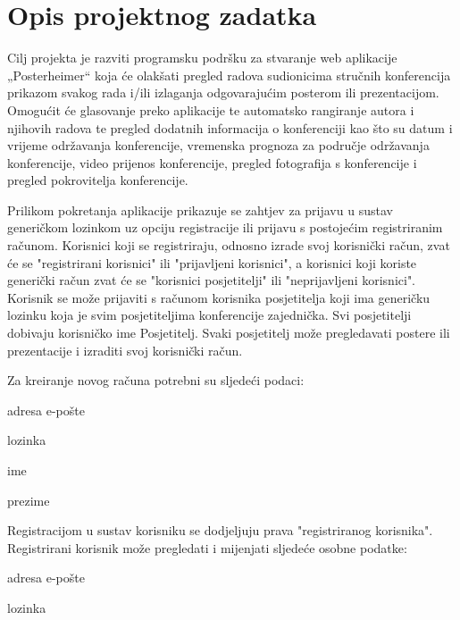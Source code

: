 \chapter{Opis projektnog zadatka}
		
		Cilj projekta je razviti programsku podršku za stvaranje web aplikacije „Posterheimer“ koja će olakšati pregled radova sudionicima stručnih konferencija prikazom svakog rada i/ili izlaganja odgovarajućim posterom ili prezentacijom. Omogućit će glasovanje preko aplikacije te automatsko rangiranje autora i njihovih radova te pregled dodatnih informacija o konferenciji kao što su datum i vrijeme održavanja konferencije, vremenska prognoza za područje održavanja konferencije, video prijenos konferencije, pregled fotografija s konferencije i pregled pokrovitelja konferencije.
		
		Prilikom pokretanja aplikacije prikazuje se zahtjev za prijavu u sustav generičkom lozinkom uz opciju registracije ili prijavu s postojećim registriranim računom.
		Korisnici koji se registriraju, odnosno izrade svoj korisnički račun, zvat će se "registrirani korisnici" ili "prijavljeni korisnici", a korisnici koji koriste generički račun zvat će se "korisnici posjetitelji" ili "neprijavljeni korisnici". Korisnik se može prijaviti s računom korisnika posjetitelja koji ima generičku lozinku koja je svim posjetiteljima konferencije zajednička. Svi posjetitelji dobivaju korisničko ime Posjetitelj. Svaki posjetitelj može pregledavati postere ili prezentacije i izraditi svoj korisnički račun.
		
		Za kreiranje novog računa potrebni su sljedeći podaci:
		\begin{packed_item}
			\item adresa e-pošte
			\item lozinka
			\item ime
			\item prezime
		\end{packed_item}
		
		Registracijom u sustav korisniku se dodjeljuju prava "registriranog korisnika". Registrirani korisnik može pregledati i mijenjati sljedeće osobne podatke:
		\begin{packed_item}
			\item adresa e-pošte
			\item lozinka
		\end{packed_item}

